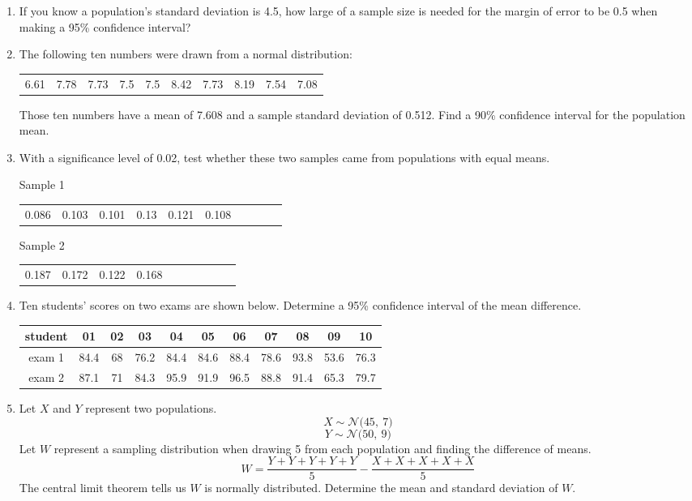 \documentclass[12pt,letterpaper]{article}
\newcommand{\N}[2]{\mathcal{N}\big(#1,~#2\big)}
\begin{document}
\begin{enumerate}
\item If you know a population's standard deviation is 4.5, how large of a sample size is needed for the margin of error to be 0.5 when making a 95\% confidence interval?
\vfill
\item The following ten numbers were drawn from a normal distribution:
\begin{center}
\begin{tabular}{cccccccccc}
6.61 & 7.78 & 7.73 & 7.5 & 7.5 & 8.42 & 7.73 & 8.19 & 7.54 & 7.08
\end{tabular}
\end{center}
Those ten numbers have a mean of 7.608 and a sample standard deviation of 0.512. Find a 90\% confidence interval for the population mean.
\vfill

\newpage

\item With a significance level of 0.02, test whether these two samples came from populations with equal means.
\begin{center}
Sample 1\\
\begin{tabular}{cccccccccc}
0.086 & 0.103 & 0.101 & 0.13 & 0.121 & 0.108
\end{tabular}
\end{center}
\begin{center}
Sample 2\\
\begin{tabular}{cccccccccc}
0.187 & 0.172 & 0.122 & 0.168
\end{tabular}
\end{center}

\newpage

\item Ten students' scores on two exams are shown below. Determine a 95\% confidence interval of the mean difference.
\begin{center}
\begin{tabular}{|c|c c c c c c c c c c|} \hline
student & 01 & 02 & 03 & 04 & 05 & 06 & 07 & 08 & 09 & 10 \\ \hline
exam 1 & 84.4 & 68 & 76.2 & 84.4 & 84.6 & 88.4 & 78.6 & 93.8 & 53.6 & 76.3 \\
exam 2 & 87.1 & 71 & 84.3 & 95.9 & 91.9 & 96.5 & 88.8 & 91.4 & 65.3 & 79.7 \\ \hline
\end{tabular}
\end{center}

\newpage

\item Let $X$ and $Y$ represent two populations.
$$X \sim \N{45}{7} $$
$$Y \sim \N{50}{9} $$
Let $W$ represent a sampling distribution when drawing 5 from each population and finding the difference of means.
$$W = \frac{Y+Y+Y+Y+Y}{5} - \frac{X+X+X+X+X}{5} $$
The central limit theorem tells us $W$ is normally distributed. Determine the mean and standard deviation of $W$.

\end{enumerate}
\end{document}
